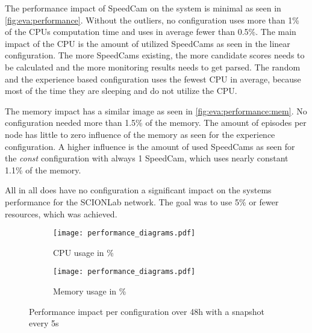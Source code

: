 \documentclass[thesis.tex]{subfiles}
\begin{document}
The performance impact of SpeedCam on the system is minimal as seen in \autoref{fig:eva:performance}. Without the outliers, no configuration uses more than 1\% of the CPUs computation time and uses in average fewer than 0.5\%. The main impact of the CPU is the amount of utilized SpeedCams as seen in the linear configuration. The more SpeedCams existing, the more candidate scores needs to be calculated and the more monitoring results needs to get parsed. The random and the experience based configuration uses the fewest CPU in average, because most of the time they are sleeping and do not utilize the CPU.

The memory impact has a similar image as seen in \autoref{fig:eva:performance:mem}. No configuration needed more than 1.5\% of the memory. The amount of episodes per node has little to zero influence of the memory as seen for the experience configuration. A higher influence is the amount of used SpeedCams as seen for the \textit{const} configuration with always 1 SpeedCam, which uses nearly constant 1.1\% of the memory.

All in all does have no configuration a significant impact on the systems performance for the SCIONLab network. The goal was to use 5\% or fewer resources, which was achieved.
\begin{figure}
	\centering
	\begin{subfigure}{0.8\linewidth}
		\centering
		\texttt{[image: performance\_diagrams.pdf]}
		\caption{CPU usage in \%}
		\label{fig:eva:performance:cpu}
	\end{subfigure}
	\hfill
	\begin{subfigure}{0.8\linewidth}
		\centering
		\texttt{[image: performance\_diagrams.pdf]}
		\caption{Memory usage in \%}
		\label{fig:eva:performance:mem}
	\end{subfigure}
	\caption{Performance impact per configuration over 48h with a snapshot every 5s}
	\label{fig:eva:performance}
\end{figure}

\subfilebib %
\end{document}
